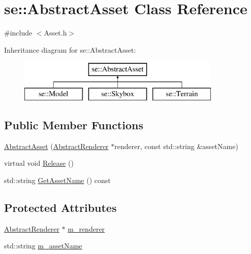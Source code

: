 \hypertarget{classse_1_1_abstract_asset}{}\section{se\+:\+:Abstract\+Asset Class Reference}
\label{classse_1_1_abstract_asset}


{\ttfamily \#include $<$Asset.\+h$>$}

Inheritance diagram for se\+:\+:Abstract\+Asset\+:\begin{figure}[H]
\begin{center}
\leavevmode
\includegraphics[height=2.000000cm]{classse_1_1_abstract_asset}
\end{center}
\end{figure}
\subsection*{Public Member Functions}
\begin{DoxyCompactItemize}
\item 
\mbox{\hyperlink{classse_1_1_abstract_asset_acb27e3d7a54233b28ce430a67448506a}{Abstract\+Asset}} (\mbox{\hyperlink{classse_1_1_abstract_renderer}{Abstract\+Renderer}} $\ast$renderer, const std\+::string \&asset\+Name)
\item 
virtual void \mbox{\hyperlink{classse_1_1_abstract_asset_af853bef4eff152bdf306cc82ccc633fd}{Release}} ()
\item 
std\+::string \mbox{\hyperlink{classse_1_1_abstract_asset_aae608bfd21c9b7a8370b0a7e37e7349c}{Get\+Asset\+Name}} () const
\end{DoxyCompactItemize}
\subsection*{Protected Attributes}
\begin{DoxyCompactItemize}
\item 
\mbox{\hyperlink{classse_1_1_abstract_renderer}{Abstract\+Renderer}} $\ast$ \mbox{\hyperlink{classse_1_1_abstract_asset_a9f151d3b1c32c1f244f1b4569e67956c}{m\+\_\+renderer}}
\item 
std\+::string \mbox{\hyperlink{classse_1_1_abstract_asset_af2a5f8455bda2db6577864b79d4246d1}{m\+\_\+asset\+Name}}
\end{DoxyCompactItemize}


